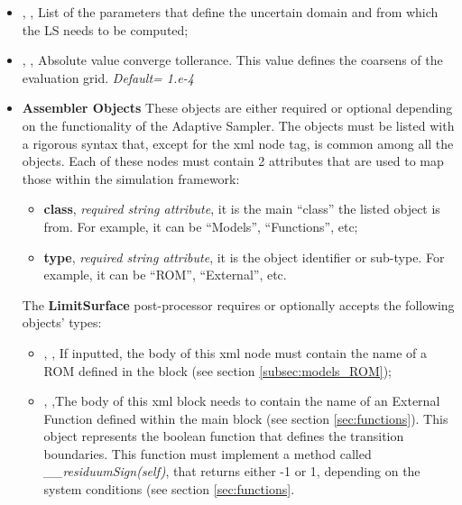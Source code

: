 \begin{itemize}
  \item {}, ,
  List of the parameters that define the uncertain domain and from which the LS
  needs to be computed;
  \item {}, ,
  Absolute value converge tollerance.
  This value defines the coarsens of the evaluation grid.
  \textit{Default= 1.e-4}
  \item \textbf{Assembler Objects} These objects are either required or optional
  depending on the functionality of the Adaptive Sampler.
  The objects must be listed with a rigorous syntax that, except for the xml
  node tag, is common among all the objects.
  Each of these nodes must contain 2 attributes that are used to map those
  within the simulation framework:
   \begin{itemize}
    \item \textbf{class}, \textit{required string attribute}, it is the main
    ``class'' the listed object is from.
    For example, it can be ``Models'', ``Functions'', etc;
    \item \textbf{type}, \textit{required string attribute}, it is the object
    identifier or sub-type.
    For example, it can be ``ROM'', ``External'', etc.
    \end{itemize}
  The \textbf{LimitSurface} post-processor requires or optionally accepts the
  following objects' types:
   \begin{itemize}
    \item {}, ,
    If inputted, the body of this xml node must contain the name of a ROM
    defined in the  block (see section \ref{subsec:models_ROM});
    \item {}, ,The body of
    this xml block needs to contain the name of an External Function defined
    within the  main block (see section \ref{sec:functions}).
    This object represents the boolean function that defines the transition
    boundaries.
    This function must implement a method called
    \textit{\_\_residuumSign(self)}, that returns either -1 or 1, depending on
    the system conditions (see section \ref{sec:functions}.
    \end{itemize}
\end{itemize}

